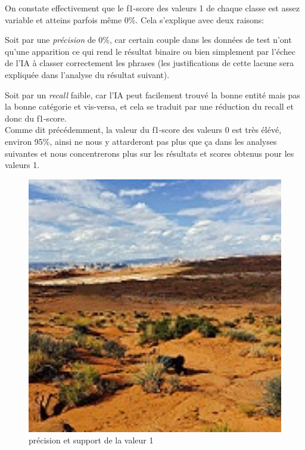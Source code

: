 \documentclass[12pt ,a4paper ]{article}
\begin{document}
\begin{multicols}{2}
On constate effectivement que le f1-score des valeurs 1 de chaque classe est assez variable et atteins parfois même 0\%. Cela s'explique avec deux raisons: 
 
\noindent Soit par une \textit{précision} de 0\%, car certain couple dans les données de test n'ont qu'une apparition ce qui rend le résultat binaire ou bien simplement par l'échec de l'IA à classer correctement les phrases (les justifications de cette lacune sera expliquée dans l'analyse du résultat suivant). 

\noindent Soit par un \textit{recall} faible, car l'IA peut facilement trouvé la bonne entité mais pas la bonne catégorie et vis-versa, et cela se traduit par une réduction du recall et donc du f1-score.\\

Comme dit précédemment, la valeur du f1-score des valeurs 0 est très élévé, environ 95\%, ainsi ne nous y attarderont pas plus que ça dans les analyses suivantes et nous concentrerons plus sur les résultats et scores obtenus pour les valeurs 1.

\begin{figure}[t]
    \begin{center}
        \includegraphics[width=1.15\textwidth]{3808.jpg}
    \end{center}
    \caption{précision et support de la valeur 1}
\end{figure}
\newpage

\end{multicols}
\end{document}
